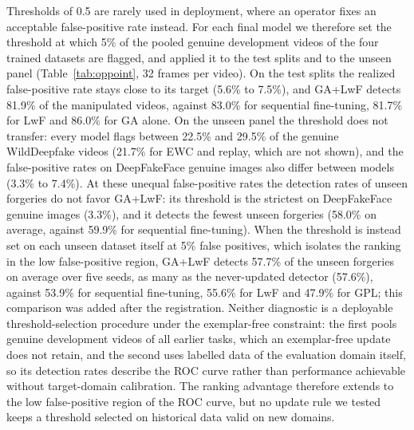 \documentclass[journal]{IEEEtran}
\begin{document}
Thresholds of 0.5 are rarely used in deployment, where an operator fixes an acceptable false-positive rate instead. For each final model we therefore set the threshold at which 5\% of the pooled genuine development videos of the four trained datasets are flagged, and applied it to the test splits and to the unseen panel (Table~\ref{tab:oppoint}, 32 frames per video). On the test splits the realized false-positive rate stays close to its target (5.6\% to 7.5\%), and GA+LwF detects 81.9\% of the manipulated videos, against 83.0\% for sequential fine-tuning, 81.7\% for LwF and 86.0\% for GA alone. On the unseen panel the threshold does not transfer: every model flags between 22.5\% and 29.5\% of the genuine WildDeepfake videos (21.7\% for EWC and replay, which are not shown), and the false-positive rates on DeepFakeFace genuine images also differ between models (3.3\% to 7.4\%). At these unequal false-positive rates the detection rates of unseen forgeries do not favor GA+LwF: its threshold is the strictest on DeepFakeFace genuine images (3.3\%), and it detects the fewest unseen forgeries (58.0\% on average, against 59.9\% for sequential fine-tuning). When the threshold is instead set on each unseen dataset itself at 5\% false positives, which isolates the ranking in the low false-positive region, GA+LwF detects 57.7\% of the unseen forgeries on average over five seeds, as many as the never-updated detector (57.6\%), against 53.9\% for sequential fine-tuning, 55.6\% for LwF and 47.9\% for GPL; this comparison was added after the registration. Neither diagnostic is a deployable threshold-selection procedure under the exemplar-free constraint: the first pools genuine development videos of all earlier tasks, which an exemplar-free update does not retain, and the second uses labelled data of the evaluation domain itself, so its detection rates describe the ROC curve rather than performance achievable without target-domain calibration. The ranking advantage therefore extends to the low false-positive region of the ROC curve, but no update rule we tested keeps a threshold selected on historical data valid on new domains.
\end{document}
